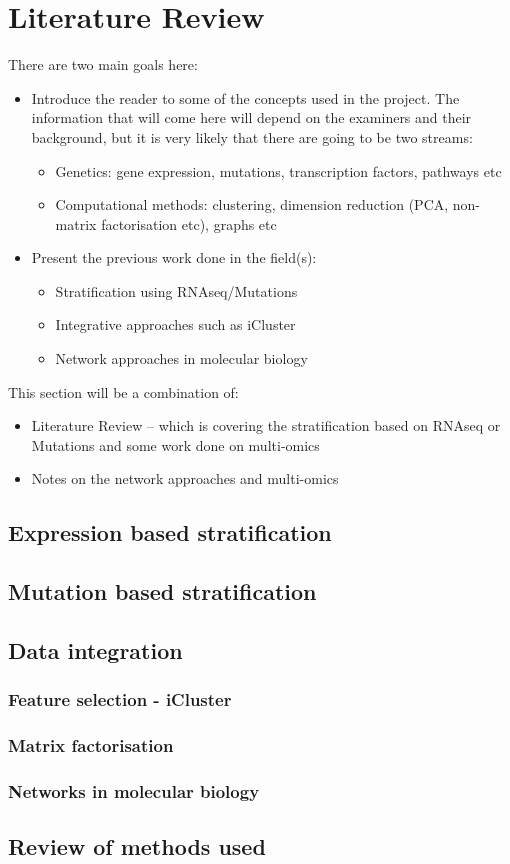 \section{Literature Review}

There are two main goals here:
\begin{itemize}
    \item Introduce the reader to some of the concepts used in the project. The information that will come here will depend on the examiners and their background, but it is very likely that there are going to be two streams:
    \begin{itemize}
        \item Genetics: gene expression, mutations, transcription factors, pathways etc
        \item Computational methods: clustering, dimension reduction (PCA, non-matrix factorisation etc), graphs etc 
    \end{itemize}
    \item Present the previous work done in the field(s):
    \begin{itemize}
        \item Stratification using RNAseq/Mutations
        \item Integrative approaches such as iCluster
        \item Network approaches in molecular biology  
    \end{itemize}
\end{itemize}

This section will be a combination of:
\begin{itemize}
    \item Literature Review -- which is covering the stratification based on RNAseq or Mutations and some work done on multi-omics
    \item Notes on the network approaches and multi-omics
\end{itemize}


\subsection{Expression based stratification}
\subsection{Mutation based stratification}
\subsection{Data integration}
\subsubsection{Feature selection - iCluster}
\subsubsection{Matrix factorisation}
\subsubsection{Networks in molecular biology}
\subsection{Review of methods used}
